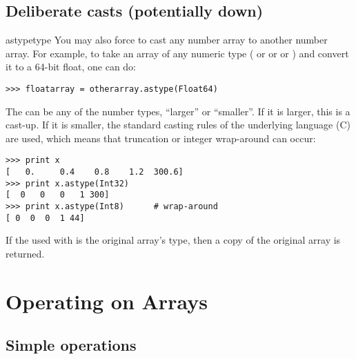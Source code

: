\subsection{Deliberate casts (potentially down)}
\label{sec:deliberate-casts}

\begin{methoddesc}{astype}{type}
   You may also force  to cast any number array to another
   number array.  For example, to take an array of any numeric type
   ( or  or  or ) and
   convert it to a 64-bit float, one can do:
\begin{verbatim}
>>> floatarray = otherarray.astype(Float64)
\end{verbatim}
   The  can be any of the number types, ``larger'' or ``smaller''. If
   it is larger, this is a cast-up. If it is smaller, the standard casting
   rules of the underlying language (C) are used, which means that truncation
   or integer wrap-around can occur:
\begin{verbatim}
>>> print x
[   0.     0.4    0.8    1.2  300.6]
>>> print x.astype(Int32)
[  0   0   0   1 300]
>>> print x.astype(Int8)      # wrap-around
[ 0  0  0  1 44]
\end{verbatim}
   If the  used with  is the original array's type,
   then a copy of the original array is returned.
\end{methoddesc}


\newpage
\section{Operating on Arrays}
\label{sec:operating-arrays}

\subsection{Simple operations}
\label{sec:simple-operations}

